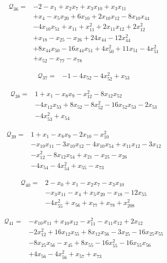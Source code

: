 \begin{align*}
\mathcal{Q}_{36}={}&-2-x_{1}+x_{2}x_{7}+x_{3}x_{10}+x_{3}x_{11}\\
&+x_{4}-x_{5}x_{20}+6x_{10}+2x_{10}x_{12}-8x_{10}x_{44}\\
&-4x_{10}x_{51}+x_{11}+x_{11}^{2}+2x_{11}x_{12}+2x_{12}^{2}\\
&+x_{18}-x_{25}-x_{26}+24x_{44}-12x_{44}^{2}\\
&+8x_{44}x_{50}-16x_{44}x_{51}+4x_{50}^{2}+11x_{51}-4x_{51}^{2}\\
&+x_{52}-x_{77}-x_{78}
\end{align*}

\begin{align*}
\mathcal{Q}_{37}={}&-1-4x_{52}-4x_{52}^{2}+x_{53}
\end{align*}

\begin{align*}
\mathcal{Q}_{38}={}&1+x_{1}-x_{8}x_{9}-x_{12}^{2}-8x_{12}x_{52}\\
&-4x_{12}x_{53}+8x_{52}-8x_{52}^{2}-16x_{52}x_{53}-2x_{53}\\
&-4x_{53}^{2}+x_{54}
\end{align*}

\begin{align*}
\mathcal{Q}_{39}={}&1+x_{1}-x_{8}x_{9}-2x_{10}-x_{10}^{2}\\
&-x_{10}x_{11}-3x_{10}x_{12}-4x_{10}x_{54}+x_{11}x_{12}-3x_{12}\\
&-x_{12}^{2}-8x_{12}x_{54}+x_{21}-x_{25}-x_{26}\\
&-4x_{54}-4x_{54}^{2}+x_{55}-x_{73}
\end{align*}

\begin{align*}
\mathcal{Q}_{40}={}&2-x_{0}+x_{1}-x_{2}x_{7}-x_{3}x_{10}\\
&-x_{3}x_{11}-x_{4}+x_{5}x_{20}-x_{18}-12x_{55}\\
&-4x_{55}^{2}+x_{56}+x_{77}+x_{78}+x_{208}^{2}
\end{align*}

\begin{align*}
\mathcal{Q}_{41}={}&-x_{10}x_{11}+x_{10}x_{12}-x_{11}^{2}-x_{11}x_{12}+2x_{12}\\
&-2x_{12}^{2}+16x_{12}x_{55}+8x_{12}x_{56}-3x_{25}-16x_{25}x_{55}\\
&-8x_{25}x_{56}-x_{45}+8x_{55}-16x_{55}^{2}-16x_{55}x_{56}\\
&+4x_{56}-4x_{56}^{2}+x_{57}+x_{73}
\end{align*}

